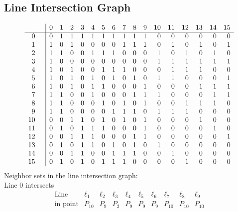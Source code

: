 \documentclass{article}
\begin{document}
{\subsection*{Line Intersection Graph}
{\arraycolsep=1pt
$$
\begin{array}{rr|*{16}r}
 &  & 0 & 1 & 2 & 3 & 4 & 5 & 6 & 7 & 8 & 9 & 10 & 11 & 12 & 13 & 14 & 15\\
\hline
0 &  & 0 & 1 & 1 & 1 & 1 & 1 & 1 & 1 & 1 & 1 & 0 & 0 & 0 & 0 & 0 & 0\\
1 &  & 1 & 0 & 1 & 0 & 0 & 0 & 0 & 1 & 1 & 1 & 0 & 1 & 0 & 1 & 0 & 1\\
2 &  & 1 & 1 & 0 & 0 & 1 & 1 & 1 & 0 & 0 & 0 & 1 & 0 & 1 & 0 & 1 & 0\\
3 &  & 1 & 0 & 0 & 0 & 0 & 0 & 0 & 0 & 0 & 0 & 1 & 1 & 1 & 1 & 1 & 1\\
4 &  & 1 & 0 & 1 & 0 & 0 & 1 & 1 & 1 & 0 & 0 & 0 & 1 & 1 & 1 & 0 & 0\\
5 &  & 1 & 0 & 1 & 0 & 1 & 0 & 1 & 0 & 1 & 0 & 1 & 1 & 0 & 0 & 0 & 1\\
6 &  & 1 & 0 & 1 & 0 & 1 & 1 & 0 & 0 & 0 & 1 & 0 & 0 & 0 & 1 & 1 & 1\\
7 &  & 1 & 1 & 0 & 0 & 1 & 0 & 0 & 0 & 1 & 1 & 1 & 0 & 0 & 0 & 1 & 1\\
8 &  & 1 & 1 & 0 & 0 & 0 & 1 & 0 & 1 & 0 & 1 & 0 & 0 & 1 & 1 & 1 & 0\\
9 &  & 1 & 1 & 0 & 0 & 0 & 0 & 1 & 1 & 1 & 0 & 1 & 1 & 1 & 0 & 0 & 0\\
10 &  & 0 & 0 & 1 & 1 & 0 & 1 & 0 & 1 & 0 & 1 & 0 & 0 & 0 & 1 & 0 & 0\\
11 &  & 0 & 1 & 0 & 1 & 1 & 1 & 0 & 0 & 0 & 1 & 0 & 0 & 0 & 0 & 1 & 0\\
12 &  & 0 & 0 & 1 & 1 & 1 & 0 & 0 & 0 & 1 & 1 & 0 & 0 & 0 & 0 & 0 & 1\\
13 &  & 0 & 1 & 0 & 1 & 1 & 0 & 1 & 0 & 1 & 0 & 1 & 0 & 0 & 0 & 0 & 0\\
14 &  & 0 & 0 & 1 & 1 & 0 & 0 & 1 & 1 & 1 & 0 & 0 & 1 & 0 & 0 & 0 & 0\\
15 &  & 0 & 1 & 0 & 1 & 0 & 1 & 1 & 1 & 0 & 0 & 0 & 0 & 1 & 0 & 0 & 0\\
\end{array}
$$
}%
Neighbor sets in the line intersection graph:\\
Line 0 intersects 
$$
\begin{array}{|r*{9}{|c}|}
\hline
\mbox{Line}  & \ell_{1} & \ell_{2} & \ell_{3} & \ell_{4} & \ell_{5} & \ell_{6} & \ell_{7} & \ell_{8} & \ell_{9}\\
\hline
\mbox{in point}  & P_{10} & P_{9} & P_{2} & P_{9} & P_{9} & P_{9} & P_{10} & P_{10} & P_{10}\\

\end{array}$$}
\end{document}
